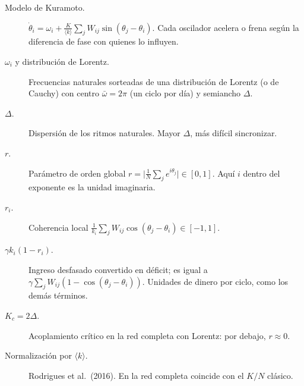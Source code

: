 \begin{terminos}
\begin{description}
\item[Modelo de Kuramoto.] $\dot\theta_i=\omega_i+\frac{K}{\langle k\rangle}\sum_jW_{ij}
\sin(\theta_j-\theta_i)$. Cada oscilador acelera o frena según la diferencia de fase con
quienes lo influyen.
\item[$\omega_i$ y distribución de Lorentz.] Frecuencias naturales sorteadas de una
distribución de Lorentz (o de Cauchy) con centro $\bar\omega=2\pi$ (un ciclo por día) y
semiancho $\Delta$.
\item[$\Delta$.] Dispersión de los ritmos naturales. Mayor $\Delta$, más difícil
sincronizar.
\item[$r$.] Parámetro de orden global $r=\bigl|\frac1N\sum_je^{i\theta_j}\bigr|\in[0,1]$.
Aquí $i$ dentro del exponente es la unidad imaginaria.
\item[$r_i$.] Coherencia local $\frac1{k_i}\sum_jW_{ij}\cos(\theta_j-\theta_i)\in[-1,1]$.
\item[$\gamma k_i(1-r_i)$.] Ingreso desfasado convertido en déficit; es igual a
$\gamma\sum_jW_{ij}(1-\cos(\theta_j-\theta_i))$. Unidades de dinero por ciclo, como
los demás términos.
\item[$K_c=2\Delta$.] Acoplamiento crítico en la red completa con Lorentz: por debajo,
$r\approx0$.
\item[Normalización por $\langle k\rangle$.] Rodrigues et al.\ (2016). En la red
completa coincide con el $K/N$ clásico.
\end{description}
\end{terminos}
\begin{preguntas}
\end{preguntas}


